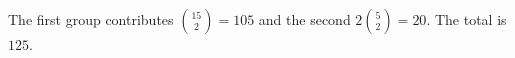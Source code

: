 The first group contributes $\binom{15}2=105$ and the second $2\binom52=20$. The total is $\boxed{125}$.
